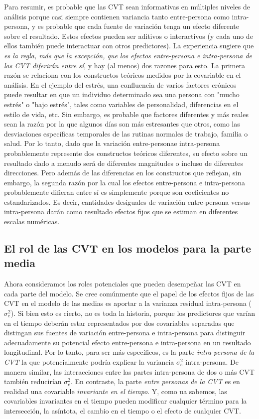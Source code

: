 \documentclass[spanish]{article}
\numberwithin{figure}{subsection}
\numberwithin{equation}{subsection}
\numberwithin{table}{subsection}
\begin{document}
Para resumir, es probable que las CVT sean informativas en múltiples niveles de
análisis porque casi siempre contienen variancia tanto entre-persona como
intra-persona, y es probable que cada fuente de variación tenga un efecto
diferente sobre el resultado. Estos efectos pueden ser aditivos o interactivos
(y cada uno de ellos también puede interactuar con otros predictores). La
experiencia sugiere que \textit{es la regla, más que la excepción, que los
efectos entre-persona e intra-persona de las CVT diferirán entre sí}, y hay (al
menos) dos razones para esto. La primera razón se relaciona con los constructos
teóricos medidos por la covariable en el análisis. En el ejemplo del estrés,
una confluencia de varios factores crónicos puede resultar en que un individuo
determinado sea una persona con "mucho estrés" o "bajo estrés", tales como
variables de personalidad, diferencias en el estilo de vida, etc. Sin embargo,
es probable que factores diferentes y más reales sean la razón por la que
algunos días son más estresantes que otros, como las desviaciones específicas
temporales de las rutinas normales de trabajo, familia o salud. Por lo tanto,
dado que la variación entre-personae intra-persona probablemente represente dos
constructos teóricos diferentes, su efecto sobre un resultado dado a menudo
será de diferentes magnitudes o incluso de diferentes direcciones. Pero además
de las diferencias en los constructos que reflejan, sin embargo, la segunda
razón por la cual los efectos entre-persona e intra-persona probablemente
difieran entre sí es simplemente porque son coeficientes no estandarizados. Es
decir, cantidades desiguales de variación entre-persona versus intra-persona
darán como resultado efectos fijos que se estiman en diferentes escalas
numéricas.

\subsection{El rol de las CVT en los modelos para la parte media}

Ahora consideramos los roles potenciales que pueden desempeñar las CVT en cada
parte del modelo. Se cree comúnmente que el papel de los efectos fijos de las
CVT en el modelo de las medias es aportar a la varianza residual intra-persona
($\sigma_e^2$). Si bien esto es cierto, no es toda la historia, porque los
predictores que varían en el tiempo deberán estar representados por dos
covariables separadas que distingan sus fuentes de variación entre-persona e
intra-persona para distinguir adecuadamente su potencial efecto entre-persona e
intra-persona en un resultado longitudinal. Por lo tanto, para ser más
específicos, es la parte \textit{intra-persona de la CVT} la que potencialmente
podría explicar la variancia $\sigma_e^2$ intra-persona. De manera similar, las
interacciones entre las partes intra-persona de dos o más CVT también
reducirían $\sigma_e^2$. En contraste, la parte \textit{entre personas de la
CVT} es en realidad una covariable \textit{invariante en el tiempo}. Y, como ua
sabemos, las covariables invariantes en el tiempo pueden modificar cualquier
término para la intersección, la asíntota, el cambio en el tiempo o el efecto
de cualquier CVT.
\end{document}
